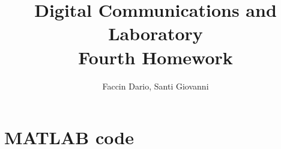 \documentclass[10pt]{article}
\begin{document}
	\title{Digital Communications and Laboratory \\ Fourth Homework}
	\author{Faccin Dario, Santi Giovanni}
	\date{}
	\maketitle
	\section*{MATLAB code}
	
	
	
	
	
	
	
		
	
	
	
	
	
	
	
	
	
	
	
	
	
	
\end{document}
